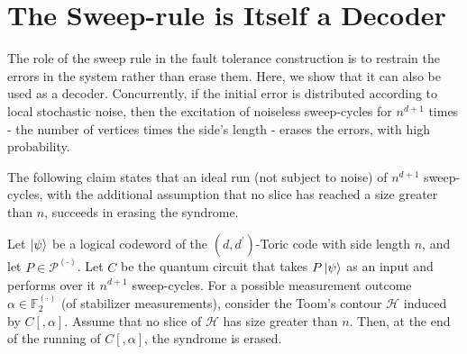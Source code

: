 

\section{The Sweep-rule is Itself a Decoder}
The role of the sweep rule in the fault tolerance construction is to restrain the errors in the system rather than erase them. Here, we show that it can also be used as a decoder. Concurrently, if the initial error is distributed according to local stochastic noise, then the excitation of noiseless sweep-cycles for $n^{d+1}$ times - the number of vertices times the side's length - erases the errors, with high probability. 





The following claim states that an ideal run (not subject to noise) of $n^{d+1}$ sweep-cycles, with the additional assumption that no slice has reached a size greater than $n$, succeeds in erasing the syndrome.
\begin{claim}
  \label{claim:decodestopnoise}
  Let $\ket{\psi}$ be a logical codeword of the $(d,d^{\prime})$-Toric code with side length $n$, and let $P \in \mathcal{P}^{(\cdot)}$. Let $C$ be the quantum circuit that takes $P\ket{\psi}$ as an input and performs over it $n^{d+1}$ sweep-cycles. For a possible measurement outcome $\alpha \in \mathbb{F}_{2}^{(\cdot)}$ (of stabilizer measurements), consider the Toom's contour $\mathcal{H}$ induced by $C[,\alpha]$. Assume that no slice of $\mathcal{H}$ has size greater than $n$. Then, at the end of the running of $C[,\alpha]$, the syndrome is erased.
\end{claim}

